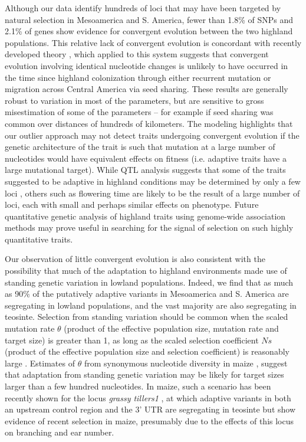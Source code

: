 Although our data identify hundreds of loci that may have been targeted by natural selection in Mesoamerica and S. America, 
fewer than 1.8\% of SNPs and 2.1\% of genes show evidence for convergent evolution between the two highland populations.
This relative lack of convergent evolution is concordant with recently developed theory \citep{ralph2014convergent},
which applied to this system suggests that convergent evolution involving identical nucleotide changes 
is unlikely to have occurred in the time since highland colonization through either recurrent mutation or migration across Central America via seed sharing.   
These results are generally robust to variation in most of the parameters, but are sensitive to gross misestimation of some of the parameters -- for example if seed sharing was common over distances of hundreds of kilometers.  
The modeling highlights that our outlier approach may not detect traits undergoing convergent evolution 
if the genetic architecture of the trait is such that mutation at a large number of nucleotides would have equivalent effects on fitness 
(i.e. adaptive traits have a large mutational target). 
While QTL analysis suggests that some of the traits suggested to be adaptive in highland conditions may be determined by only a few loci \citep{Lauter_2004_15342532}, 
others such as flowering time \citep{buckler2009genetic} are likely to be the result of a large number of loci, each with small and perhaps similar effects on phenotype.  
Future quantitative genetic analysis of highland traits using genome-wide association methods may prove useful in searching for the signal of selection on such highly quantitative traits. 

Our observation of little convergent evolution is also consistent with the possibility that much of the adaptation to highland environments made use of standing genetic variation in lowland populations. 
Indeed, we find that as much as 90\% of the putatively adaptive variants in Mesoamerica and S. America are segregating in lowland populations, 
and the vast majority are also segregating in teosinte.  
Selection from standing variation should be common when the scaled mutation rate $\theta$ 
(product of the effective population size, mutation rate and target size) is greater than 1,
as long as the scaled selection coefficient $Ns$ 
(product of the effective population size and selection coefficient) is reasonably large \cite[]{Hermisson_2005_15716498}.
Estimates of $\theta$ from synonymous nucleotide diversity in maize  \citep{Tenaillon_2004_15014173,Wright_2005_15919994,Ross-Ibarra_2009_19153259}, 
suggest that adaptation from standing genetic variation may be likely for target sizes larger than a few hundred nucleotides.
In maize, such a scenario has been recently shown for the locus \emph{grassy tillers1} \cite[]{Wills_2013_23825971}, at which adaptive variants in both an upstream control region and the 3' UTR are segregating in teosinte but show evidence of recent selection in maize, presumably due to the effects of this locus on branching and ear number.

